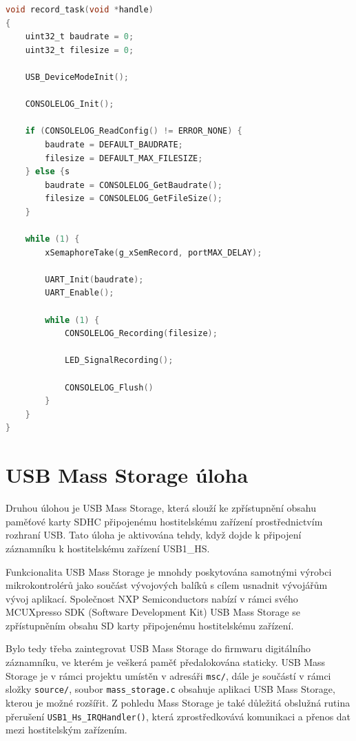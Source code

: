 \begin{lstlisting}[language=C, caption={Pseudokód funkce \texttt{record\_task}}, label={lst:record_task}]
void record_task(void *handle)
{
    uint32_t baudrate = 0;
    uint32_t filesize = 0;

    USB_DeviceModeInit();

    CONSOLELOG_Init();

    if (CONSOLELOG_ReadConfig() != ERROR_NONE) {
        baudrate = DEFAULT_BAUDRATE;
        filesize = DEFAULT_MAX_FILESIZE;
    } else {s
        baudrate = CONSOLELOG_GetBaudrate();
        filesize = CONSOLELOG_GetFileSize();
    }

    while (1) {
        xSemaphoreTake(g_xSemRecord, portMAX_DELAY);

        UART_Init(baudrate);
        UART_Enable();

        while (1) {
            CONSOLELOG_Recording(filesize);
            
            LED_SignalRecording();

            CONSOLELOG_Flush()
        }
    }
}
\end{lstlisting}

\section{USB Mass Storage úloha}
Druhou úlohou je USB Mass Storage, která slouží ke zpřístupnění obsahu paměťové karty SDHC připojenému hostitelskému zařízení prostřednictvím rozhraní USB. Tato úloha je aktivována tehdy, když dojde k připojení záznamníku k hostitelskému zařízení USB1\_HS.

Funkcionalita USB Mass Storage je mnohdy poskytována samotnými výrobci mikrokontrolérů jako součást vývojových balíků s cílem usnadnit vývojářům vývoj aplikací. Společnost NXP Semiconductors nabízí v rámci svého MCUXpresso SDK (Software Development Kit) USB Mass Storage se zpřístupněním obsahu SD karty připojenému hostitelskému zařízení.

Bylo tedy třeba zaintegrovat USB Mass Storage do firmwaru digitálního záznamníku, ve kterém je veškerá paměť předalokována staticky. USB Mass Storage je v rámci projektu umístěn v adresáři \texttt{msc/}, dále je součástí v rámci složky \texttt{source/}, soubor \texttt{mass\_storage.c} obsahuje aplikaci USB Mass Storage, kterou je možné rozšířit. Z pohledu Mass Storage je také důležitá obslužná rutina přerušení \texttt{USB1\_Hs\_IRQHandler()}, která zprostředkovává komunikaci a přenos dat mezi hostitelským zařízením.

